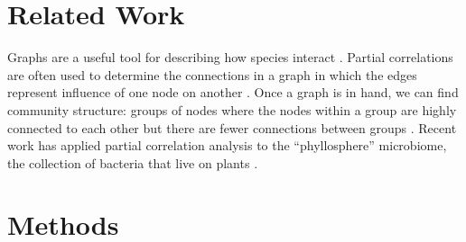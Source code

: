 \documentclass[12pt]{article}
\begin{document}



\section{Related Work}

Graphs are a useful tool for describing how species interact \cite{borthagaray2014inferring}.
Partial correlations are often used to determine the connections in a graph in which the edges represent influence of one node on another \cite{hero2012hub}. 
Once a graph is in hand, we can find community structure: groups of nodes where the nodes within a group are highly connected to each other but there are fewer connections between groups \cite{girvan2002community}.
Recent work has applied partial correlation analysis to the ``phyllosphere'' microbiome, the collection of bacteria that live on plants \cite{agler2016microbial}.


\section{Methods} %
\end{document}
